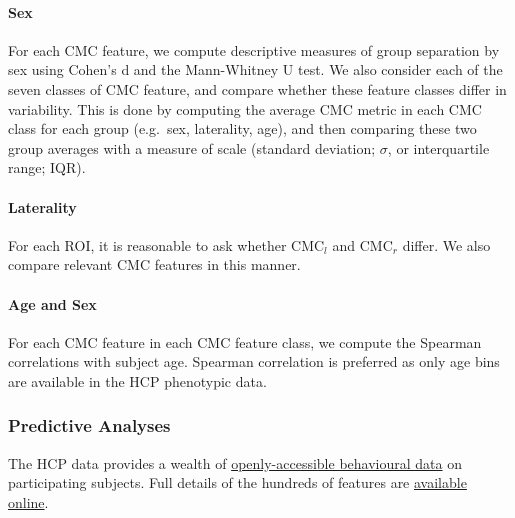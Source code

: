 \documentclass{article}
\begin{document}
\paragraph{Sex} For each CMC feature, we compute descriptive measures of
group separation by sex using Cohen's d and the Mann-Whitney U test. We also
consider each of the seven classes of CMC feature, and compare whether these
feature classes differ in variability. This is done by computing the average
CMC metric in each CMC class for each group (e.g.\ sex, laterality, age), and
then comparing these two group averages with a measure of scale (standard
deviation; \(\sigma\), or interquartile range; IQR).

%

\paragraph{Laterality} For each ROI, it is reasonable to ask whether
\(\text{CMC}_l\) and \(\text{CMC}_r\) differ. We also compare relevant CMC
features in this manner.

\paragraph{Age and Sex} For each CMC feature in each CMC feature class, we
compute the Spearman correlations with subject age. Spearman
correlation is preferred as only age bins are available in the HCP phenotypic
data.


\subsubsection{Predictive Analyses}

The HCP data provides a wealth of
\href{https://www.humanconnectome.org/study/hcp-young-adult/document/wu-minn-hcp-consortium-open-access-data-use-terms}{openly-accessible
behavioural data} on participating subjects. Full details of the hundreds of
features are
\href{https://wiki.humanconnectome.org/docs/HCP-YA%20Data%20Dictionary-%20Updated%20for%20the%201200%20Subject%20Release.html}{available
online}.
\end{document}
